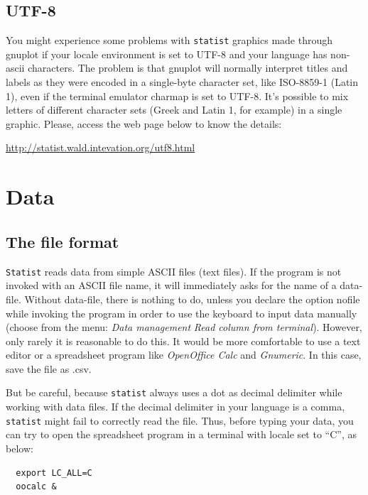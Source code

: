 \documentclass[12pt,english]{article}
\newcommand{\st}{{\tt sta\-tist} }
\begin{document}
\subsection{UTF-8}

You might experience some problems with \st graphics
made through gnuplot if your locale environment is set to
UTF-8 and your language has non-ascii characters. The
problem is that gnuplot will normally interpret titles and
labels as they were encoded in a single-byte character set,
like ISO-8859-1 (Latin 1), even if the terminal emulator
charmap is set to UTF-8. It's possible to mix letters of
different character sets (Greek and Latin 1, for example) in
a single graphic. Please, access the web page below to know
the details:

\href{http://statist.wald.intevation.org/utf8.html}
{http://statist.wald.intevation.org/utf8.html}

\section{Data}

\subsection{The file format}

{\tt Statist} reads data from simple ASCII files (text
files).  If the program is not invoked with an ASCII file
name, it will immediately asks for the name of a data-file.
Without data-file, there is nothing to do, unless you
declare the option \verb --nofile  while invoking the
program in order to use the keyboard to input data manually
(choose from the menu: {\em Data management} {\textbar} {\em Read column
from terminal}). However, only rarely it is reasonable to do
this. It would be more comfortable to use a text editor or a
spreadsheet program like {\em OpenOffice Calc} and {\em
Gnumeric}. In this case, save the file as .csv.

But be careful, because \st always uses a dot as decimal
delimiter while working with data files. If the decimal
delimiter in your language is a comma, \st might fail to
correctly read the file. Thus, before typing your
data, you can try to open the spreadsheet program in a
terminal with locale set to ``C'', as below:

\begin{verbatim}
  export LC_ALL=C
  oocalc &
\end{verbatim}
\end{document}

